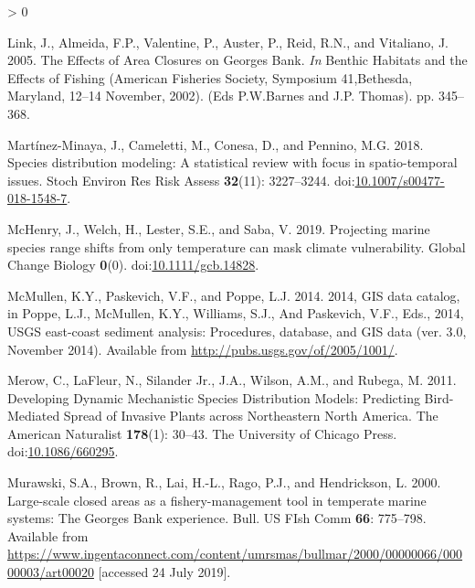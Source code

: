 \documentclass[
]{article}
\newlength{\cslhangindent}
\newenvironment{CSLReferences}[2] %
 {%
  \setlength{\parindent}{0pt}
  \ifodd #1 \everypar{\setlength{\hangindent}{\cslhangindent}}\ignorespaces\fi
  \ifnum #2 > 0
  \setlength{\parskip}{#2\baselineskip}
  \fi
 }%
 {}
\begin{document}
\begin{CSLReferences}{1}{0}
\leavevmode\hypertarget{ref-linkEffectsAreaClosures2005}{}%
Link, J., Almeida, F.P., Valentine, P., Auster, P., Reid, R.N., and Vitaliano, J. 2005. The {Effects} of {Area Closures} on {Georges Bank}. \emph{In} Benthic {Habitats} and the {Effects} of {Fishing} ({American Fisheries Society}, {Symposium} 41,{Bethesda}, {Maryland}, 12--14 {November}, 2002). (Eds {P}.{W}.{Barnes} and {J}.{P}. {Thomas}). pp. 345--368.

\leavevmode\hypertarget{ref-martinez-minayaSpeciesDistributionModeling2018}{}%
Martínez-Minaya, J., Cameletti, M., Conesa, D., and Pennino, M.G. 2018. Species distribution modeling: A statistical review with focus in spatio-temporal issues. Stoch Environ Res Risk Assess \textbf{32}(11): 3227--3244. doi:\href{https://doi.org/10.1007/s00477-018-1548-7}{10.1007/s00477-018-1548-7}.

\leavevmode\hypertarget{ref-mchenryProjectingMarineSpecies2019}{}%
McHenry, J., Welch, H., Lester, S.E., and Saba, V. 2019. Projecting marine species range shifts from only temperature can mask climate vulnerability. Global Change Biology \textbf{0}(0). doi:\href{https://doi.org/10.1111/gcb.14828}{10.1111/gcb.14828}.

\leavevmode\hypertarget{ref-mcmullen2014GISData2014}{}%
McMullen, K.Y., Paskevich, V.F., and Poppe, L.J. 2014. 2014, {GIS} data catalog, in {Poppe}, {L}.{J}., {McMullen}, {K}.{Y}., {Williams}, {S}.{J}., And {Paskevich}, {V}.{F}., Eds., 2014, {USGS} east-coast sediment analysis: {Procedures}, database, and {GIS} data (ver. 3.0, {November} 2014). Available from \url{http://pubs.usgs.gov/of/2005/1001/}.

\leavevmode\hypertarget{ref-merowDevelopingDynamicMechanistic2011}{}%
Merow, C., LaFleur, N., Silander Jr., J.A., Wilson, A.M., and Rubega, M. 2011. Developing {Dynamic Mechanistic Species Distribution Models}: {Predicting Bird}-{Mediated Spread} of {Invasive Plants} across {Northeastern North America}. The American Naturalist \textbf{178}(1): 30--43. {The University of Chicago Press}. doi:\href{https://doi.org/10.1086/660295}{10.1086/660295}.

\leavevmode\hypertarget{ref-murawskiLargescaleClosedAreas2000}{}%
Murawski, S.A., Brown, R., Lai, H.-L., Rago, P.J., and Hendrickson, L. 2000. Large-scale closed areas as a fishery-management tool in temperate marine systems: The {Georges Bank} experience. Bull. US FIsh Comm \textbf{66}: 775--798. Available from \url{https://www.ingentaconnect.com/content/umrsmas/bullmar/2000/00000066/00000003/art00020} {[}accessed 24 July 2019{]}.


\end{CSLReferences}
\end{document}
